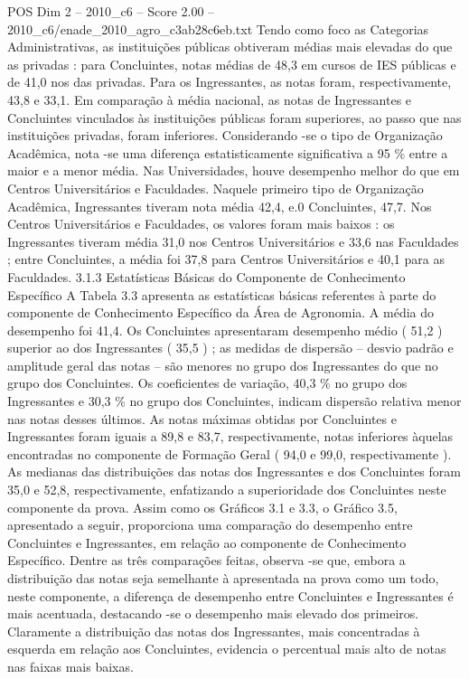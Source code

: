 \begin{textsample}{POS Dim 2 – 2010\_c6 – Score 2.00 – 2010\_c6/enade\_2010\_agro\_c3ab28c6eb.txt}
Tendo como foco as Categorias Administrativas, as instituições públicas obtiveram médias mais elevadas do que as privadas : para Concluintes, notas médias de 48,3 em cursos de IES públicas e de 41,0 nos das privadas.
Para os Ingressantes, as notas foram, respectivamente, 43,8 e 33,1.
Em comparação à média nacional, as notas de Ingressantes e Concluintes vinculados às instituições públicas foram superiores, ao passo que nas instituições privadas, foram inferiores.
Considerando -se o tipo de Organização Acadêmica, nota -se uma diferença estatisticamente significativa a 95 \% entre a maior e a menor média.
Nas Universidades, houve desempenho melhor do que em Centros Universitários e Faculdades.
Naquele primeiro tipo de Organização Acadêmica, Ingressantes tiveram nota média 42,4, e.0 Concluintes, 47,7.
Nos Centros Universitários e Faculdades, os valores foram mais baixos : os Ingressantes tiveram média 31,0 nos Centros Universitários e 33,6 nas Faculdades ; entre Concluintes, a média foi 37,8 para Centros Universitários e 40,1 para as Faculdades. 3.1.3 Estatísticas Básicas do Componente de Conhecimento Específico A Tabela 3.3 apresenta as estatísticas básicas referentes à parte do componente de Conhecimento Específico da Área de Agronomia.
A média do desempenho foi 41,4.
Os Concluintes apresentaram desempenho médio ( 51,2 ) superior ao dos Ingressantes ( 35,5 ) ; as medidas de dispersão – desvio padrão e amplitude geral das notas – são menores no grupo dos Ingressantes do que no grupo dos Concluintes.
Os coeficientes de variação, 40,3 \% no grupo dos Ingressantes e 30,3 \% no grupo dos Concluintes, indicam dispersão relativa menor nas notas desses últimos.
As notas máximas obtidas por Concluintes e Ingressantes foram iguais a 89,8 e 83,7, respectivamente, notas inferiores àquelas encontradas no componente de Formação Geral ( 94,0 e 99,0, respectivamente ).
As medianas das distribuições das notas dos Ingressantes e dos Concluintes foram 35,0 e 52,8, respectivamente, enfatizando a superioridade dos Concluintes neste componente da prova.
Assim como os Gráficos 3.1 e 3.3, o Gráfico 3.5, apresentado a seguir, proporciona uma comparação do desempenho entre Concluintes e Ingressantes, em relação ao componente de Conhecimento Específico.
Dentre as três comparações feitas, observa -se que, embora a distribuição das notas seja semelhante à apresentada na prova como um todo, neste componente, a diferença de desempenho entre Concluintes e Ingressantes é mais acentuada, destacando -se o desempenho mais elevado dos primeiros.
Claramente a distribuição das notas dos Ingressantes, mais concentradas à esquerda em relação aos Concluintes, evidencia o percentual mais alto de notas nas faixas mais baixas.

\end{textsample}

